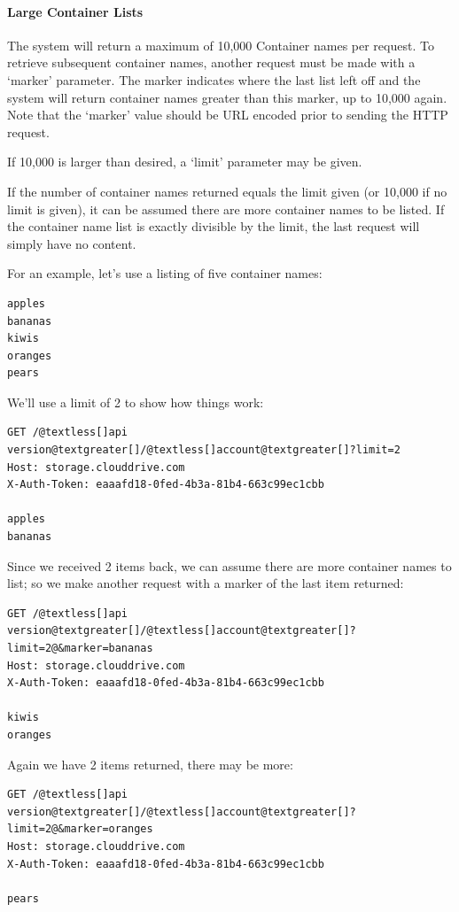 \documentclass[letterpaper,10pt,english]{manual}
\begin{document}
\paragraph{Large Container Lists}

The system will return a maximum of 10,000 Container names per request.
To retrieve subsequent container names, another request must be made with
a `marker' parameter. The marker indicates where the last list left off
and the system will return container names greater than this marker, up to
10,000 again.  Note that the ‘marker’ value should be URL encoded prior to
sending the HTTP request.

If 10,000 is larger than desired, a `limit' parameter may be given.

If the number of container names returned equals the limit given (or
10,000 if no limit is given), it can be assumed there are more container
names to be listed. If the container name list is exactly divisible by the
limit, the last request will simply have no content.

For an example, let's use a listing of five container names:

\begin{Verbatim}[commandchars=@\[\]]
apples
bananas
kiwis
oranges
pears
\end{Verbatim}

We'll use a limit of 2 to show how things work:

\begin{Verbatim}[commandchars=@\[\]]
GET /@textless[]api version@textgreater[]/@textless[]account@textgreater[]?limit=2
Host: storage.clouddrive.com
X-Auth-Token: eaaafd18-0fed-4b3a-81b4-663c99ec1cbb

apples
bananas
\end{Verbatim}

Since we received 2 items back, we can assume there are more container
names to list; so we make another request with a marker of the last item
returned:

\begin{Verbatim}[commandchars=@\[\]]
GET /@textless[]api version@textgreater[]/@textless[]account@textgreater[]?limit=2@&marker=bananas
Host: storage.clouddrive.com
X-Auth-Token: eaaafd18-0fed-4b3a-81b4-663c99ec1cbb

kiwis
oranges
\end{Verbatim}

Again we have 2 items returned, there may be more:

\begin{Verbatim}[commandchars=@\[\]]
GET /@textless[]api version@textgreater[]/@textless[]account@textgreater[]?limit=2@&marker=oranges
Host: storage.clouddrive.com
X-Auth-Token: eaaafd18-0fed-4b3a-81b4-663c99ec1cbb

pears
\end{Verbatim}
\end{document}
